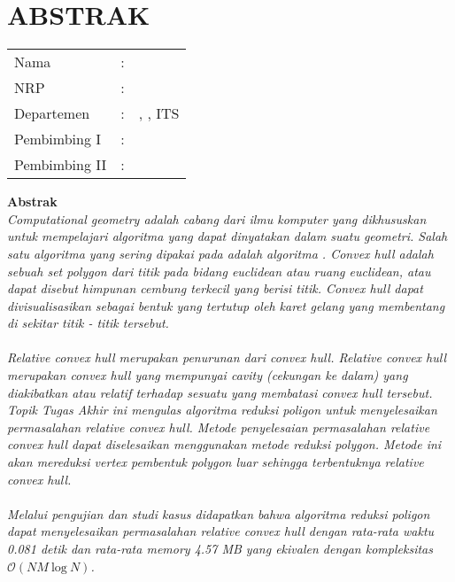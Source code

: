 \chapter {ABSTRAK}


\noindent\textbf{\MakeUppercase\judul}
\vspace*{1em}

\begin{tabularx}{\linewidth}{ l l p{2.2in} }
	Nama 			& : & \penulis \\
	NRP 			& :	& \nrp \\
	Departemen 		& : & \jurusan, \newline \fakultas, ITS \\
	Pembimbing I 	& : & \pembimbingsatu \\
	Pembimbing II 	& : & \pembimbingdua
	\vspace*{1em} 	%
\end {tabularx}

\noindent\textbf{Abstrak} \\
\itshape
\textit{Computational geometry} adalah cabang dari ilmu komputer yang dikhususkan untuk mempelajari algoritma yang dapat dinyatakan dalam suatu geometri. Salah satu algoritma yang sering dipakai pada \CG adalah algoritma \CH. \textit{Convex hull} adalah sebuah set polygon dari titik pada bidang \textit{euclidean} atau ruang \textit{euclidean}, atau dapat disebut himpunan cembung terkecil yang berisi titik. Convex hull dapat divisualisasikan sebagai bentuk yang tertutup oleh karet gelang yang membentang di sekitar titik - titik tersebut.\\\\
\textit{Relative convex hull} merupakan penurunan dari \textit{convex hull}. \textit{Relative convex hull} merupakan \textit{convex hull} yang mempunyai \textit{cavity} (cekungan ke dalam) yang diakibatkan atau relatif terhadap sesuatu yang membatasi \textit{convex hull} tersebut. Topik Tugas Akhir ini mengulas algoritma reduksi poligon untuk menyelesaikan permasalahan \textit{relative convex hull}. Metode penyelesaian permasalahan \textit{relative convex hull} dapat diselesaikan menggunakan metode reduksi polygon. Metode ini akan mereduksi vertex pembentuk polygon luar sehingga terbentuknya \textit{relative convex hull}.\\\\
Melalui pengujian dan studi kasus didapatkan bahwa algoritma reduksi poligon dapat menyelesaikan permasalahan \textit{relative convex hull} dengan rata-rata waktu 0.081 detik dan rata-rata memory 4.57 MB yang ekivalen dengan kompleksitas $\mathcal{O}{(NM\ \text{log}\ N)}$.

